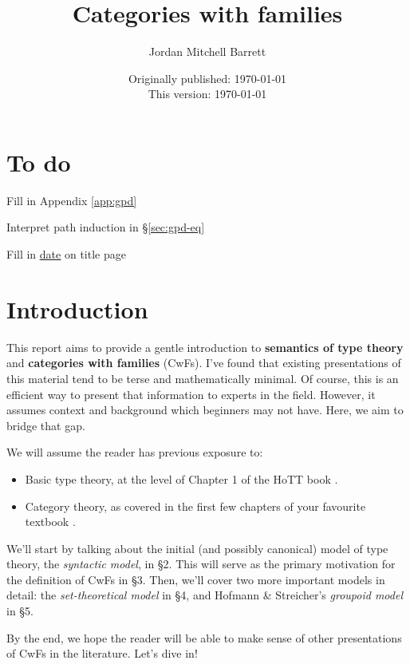 \documentclass{article}
\title{Categories with families}
\author{Jordan Mitchell Barrett}
\date{Originally published: {\color{red}\label{todo:date} \today} \\[2mm] This version: \today}
\theoremstyle{definition}
\begin{document}
\maketitle
\tableofcontents


{\color{red}
\section*{To do}

Fill in Appendix \ref{app:gpd}

Interpret path induction in \S\ref{sec:gpd-eq}

Fill in \hyperref[todo:date]{\underline{date}} on title page
}





\section{Introduction}

This report aims to provide a gentle introduction to \textbf{semantics of type theory} and \textbf{categories with families} (CwFs). I've found that existing presentations of this material tend to be terse and mathematically minimal. Of course, this is an efficient way to present that information to experts in the field. However, it assumes context and background which beginners may not have. Here, we aim to bridge that gap.

We will assume the reader has previous exposure to:
\begin{itemize}
    \item Basic type theory, at the level of Chapter 1 of the HoTT book \cite{hottbook}.
    
    \item Category theory, as covered in the first few chapters of your favourite textbook \cite{leinster, maclane}.
\end{itemize}

We'll start by talking about the initial (and possibly canonical) model of type theory, the \textit{syntactic model}, in \S2. This will serve as the primary motivation for the definition of CwFs in \S3. Then, we'll cover two more important models in detail: the \textit{set-theoretical model} in \S4, and Hofmann \& Streicher's \textit{groupoid model} \cite{gpoid} in \S5.

By the end, we hope the reader will be able to make sense of other presentations of CwFs in the literature. Let's dive in!
\end{document}
